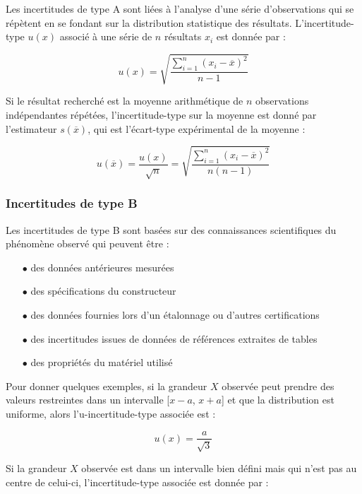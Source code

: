 \documentclass{article}
\begin{document}
Les incertitudes de type A sont liées à l'analyse d'une série d'observations qui se répètent en se fondant sur la distribution statistique des résultats. L'incertitude-type $u(x)$ associé à une série de $n$ résultats $x_i$ est donnée par :

\begin{equation}
  u(x) = \sqrt{\dfrac{\sum\limits_{i=1}^n (x_i - \overline{x})^2}{n-1}}
\end{equation}

Si le résultat recherché est la moyenne arithmétique de $n$ observations indépendantes répétées, l'incertitude-type sur la moyenne est donné par l'estimateur $s(\overline{x})$, qui est l'écart-type expérimental de la moyenne :

\begin{equation}
  u(\overline{x}) = \dfrac{u(x)}{\sqrt{n}} = \sqrt{\dfrac{\sum\limits_{i=1}^n (x_i - \overline{x})^2}{n(n-1)}}
\end{equation}

\subsubsection{Incertitudes de type B}

Les incertitudes de type B sont basées sur des connaissances scientifiques du phénomène observé qui peuvent être :

\begin{itemize}
  \item[$\bullet$] des données antérieures mesurées
  \item[$\bullet$] des spécifications du constructeur
  \item[$\bullet$] des données fournies lors d'un étalonnage ou d'autres certifications
  \item[$\bullet$] des incertitudes issues de données de références extraites de tables
  \item[$\bullet$] des propriétés du matériel utilisé
\end{itemize}

Pour donner quelques exemples, si la grandeur $X$ observée peut prendre des valeurs restreintes dans un intervalle [$x - a$, $x + a$] et que la distribution est uniforme, alors l'u-incertitude-type associée est :

\begin{equation}
  u(x) = \dfrac{a}{\sqrt{3}}
\end{equation}

Si la grandeur $X$ observée est dans un intervalle bien défini mais qui n'est pas au centre de celui-ci, l'incertitude-type associée est donnée par :
\end{document}

